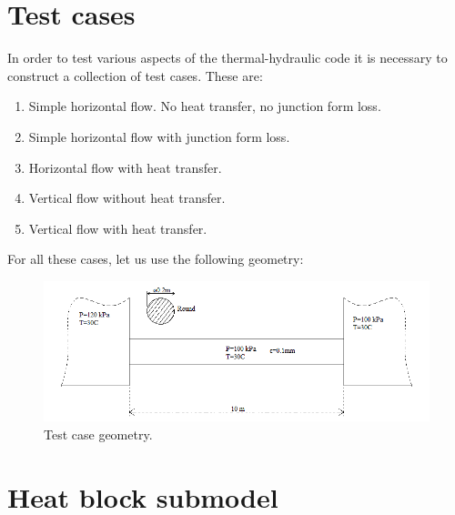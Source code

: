 \documentclass[11pt,letterpaper,titlepage]{article}
\begin{document}
\newpage
{}
\section{Test cases}
In order to test various aspects of the thermal-hydraulic code it is necessary to construct a collection of test cases. These are:

\begin{enumerate}
\item Simple horizontal flow. No heat transfer, no junction form loss.
\item Simple horizontal flow with junction form loss.
\item Horizontal flow with heat transfer.
\item Vertical flow without heat transfer.
\item Vertical flow with heat transfer.
\end{enumerate}
\vspace{0.5cm}\noindent
For all these cases, let us use the following geometry:

	\begin{center}
		\begin{minipage}[c]{0.85\textwidth}
	
			\begin{figure}[H]
			
				\includegraphics[width=6in]{ZZZ_TestCase.png}
				\caption{Test case geometry.}
				\label{figure:ZZZ_TestCase}
			\end{figure}
		\end{minipage}
	\end{center}
\vspace{0.5cm}













\newpage
{}
\section{Heat block submodel}
\end{document}
